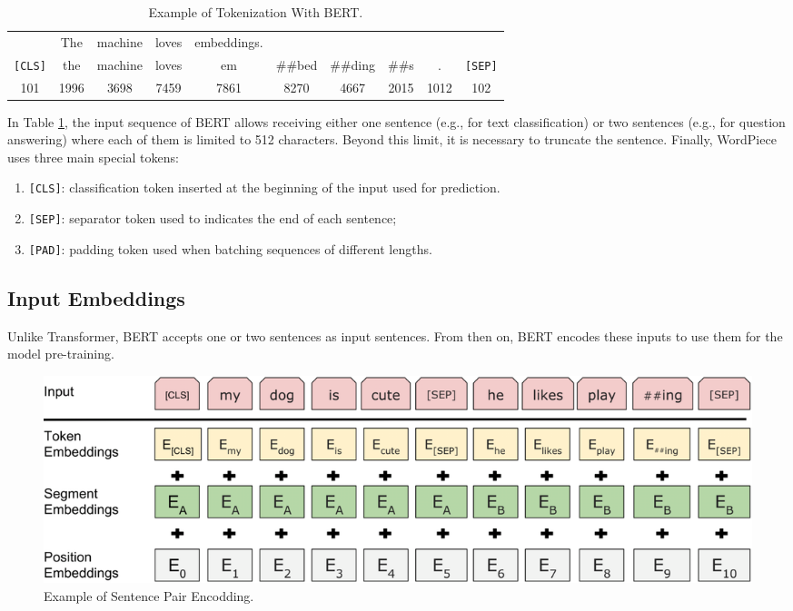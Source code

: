\begin{table}[!ht]
  \centering
  \caption{Example of Tokenization With BERT.}
  \label{tab:bert:tokenization}
  \begin{tabular}{cccccccccc}
    & The & machine & loves & embeddings. & & & & & \\
    \texttt{[CLS]} & the & machine & loves & em & \#\#bed & \#\#ding & \#\#s & . & \texttt{[SEP]} \\
    101 & 1996 & 3698 & 7459 & 7861 & 8270 & 4667 & 2015 & 1012 & 102 \\
  \end{tabular}
\end{table}

In Table \ref{tab:bert:tokenization}, the input sequence of BERT allows
receiving either one sentence (e.g., for text classification) or two sentences
(e.g., for question answering) where each of them is limited to 512
characters. Beyond this limit, it is necessary to truncate the
sentence. Finally, WordPiece uses three main special tokens:
\begin{enumerate}
\item \texttt{[CLS]}: classification token inserted at the beginning of the
  input used for prediction.
\item \texttt{[SEP]}: separator token used to indicates the end of each sentence;
\item \texttt{[PAD]}: padding token used when batching sequences of different lengths.
\end{enumerate}

\subsection{Input Embeddings}
\label{subsec:bert:input:embeddings}

Unlike Transformer, BERT accepts one or two sentences as input sentences. From
then on, BERT encodes these inputs to use them for the model pre-training.

\newpage

\begin{figure}[!ht]
  \centering
  \includegraphics[width=\textwidth]{img/embedders/bert/input-embeddings}
  \caption{Example of Sentence Pair Encodding.}
  \label{fig:sentence:pair:encoding}
\end{figure}

